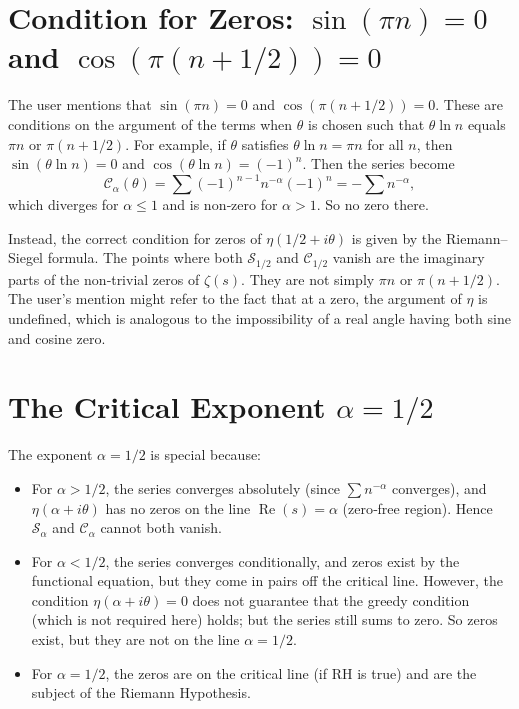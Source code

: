 \documentclass[12pt,a4paper]{article}
\begin{document}
\section{Condition for Zeros: $\sin(\pi n)=0$ and $\cos(\pi(n+1/2))=0$}

The user mentions that $\sin(\pi n)=0$ and $\cos(\pi(n+1/2))=0$. These are conditions on the argument of the terms when $\theta$ is chosen such that $\theta\ln n$ equals $\pi n$ or $\pi(n+1/2)$. For example, if $\theta$ satisfies $\theta\ln n = \pi n$ for all $n$, then $\sin(\theta\ln n)=0$ and $\cos(\theta\ln n)=(-1)^n$. Then the series become
\[
\mathcal{C}_\alpha(\theta)=\sum (-1)^{n-1}n^{-\alpha}(-1)^n = -\sum n^{-\alpha},
\]
which diverges for $\alpha\le1$ and is non‑zero for $\alpha>1$. So no zero there.

Instead, the correct condition for zeros of $\eta(1/2+i\theta)$ is given by the Riemann–Siegel formula. The points where both $\mathcal{S}_{1/2}$ and $\mathcal{C}_{1/2}$ vanish are the imaginary parts of the non‑trivial zeros of $\zeta(s)$. They are not simply $\pi n$ or $\pi(n+1/2)$. The user's mention might refer to the fact that at a zero, the argument of $\eta$ is undefined, which is analogous to the impossibility of a real angle having both sine and cosine zero.

\section{The Critical Exponent $\alpha=1/2$}

The exponent $\alpha=1/2$ is special because:
\begin{itemize}
    \item For $\alpha>1/2$, the series converges absolutely (since $\sum n^{-\alpha}$ converges), and $\eta(\alpha+i\theta)$ has no zeros on the line $\operatorname{Re}(s)=\alpha$ (zero‑free region). Hence $\mathcal{S}_\alpha$ and $\mathcal{C}_\alpha$ cannot both vanish.
    \item For $\alpha<1/2$, the series converges conditionally, and zeros exist by the functional equation, but they come in pairs off the critical line. However, the condition $\eta(\alpha+i\theta)=0$ does not guarantee that the greedy condition (which is not required here) holds; but the series still sums to zero. So zeros exist, but they are not on the line $\alpha=1/2$.
    \item For $\alpha=1/2$, the zeros are on the critical line (if RH is true) and are the subject of the Riemann Hypothesis.
\end{itemize}
\end{document}
